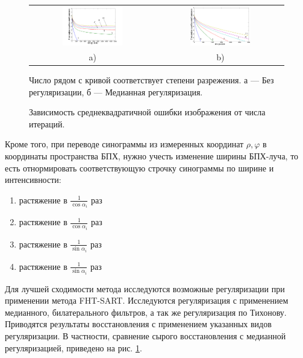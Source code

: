 \begin{figure}
\centering
\begin{tabular}{@{}c@{}c}
    \includegraphics[width=0.50\textwidth]{Dissertation/images/part1_img/raw}
&
    \includegraphics[width=0.50\textwidth]{Dissertation/images/part1_img/medk}
\\
   \small a) & \small b)
\end{tabular}
  \caption{Зависимость среднеквадратичной ошибки изображения от числа итераций.}
Число рядом с кривой соответствует степени разрежения. а --- Без регуляризации, б --- Медианная регуляризация.
\label{fig:conv_all}
\end{figure}

Кроме того, при переводе синограммы из измеренных координат $\rho, \varphi$ в координаты пространства БПХ, нужно учесть изменение ширины БПХ-луча, то есть отнормировать соответствующую строчку синограммы по ширине и интенсивности:
\begin{enumerate}[label=\Roman*.]
	\item растяжение в $\frac 1 {\cos \alpha_i}$ раз
	\item растяжение в $\frac 1 {\cos \alpha_i}$ раз
	\item растяжение в $\frac 1 {\sin \alpha_i}$ раз
	\item растяжение в $\frac 1 {\sin \alpha_i}$ раз
\end{enumerate}
Для лучшей сходимости метода исследуются возможные регуляризации при применении метода FHT-SART.
Исследуются регуляризация с применением медианного, билатерального фильтров, а так же регуляризация по Тихонову.
Приводятся результаты восстановления с применением указанных видов регуляризации.
В частности, сравнение сырого восстановления с медианной регуляризацией, приведено на рис. \ref{fig:conv_all}.

